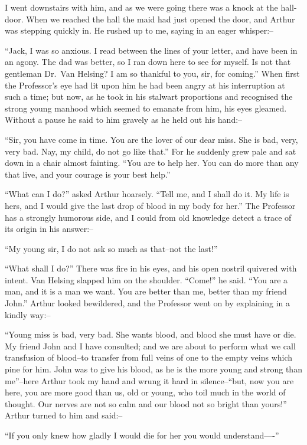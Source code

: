 \documentclass[12pt,openright]{book}
\begin{document}
I went downstairs with him, and as we were going there was a knock at the hall-door. When we reached the hall the maid had just opened the door, and Arthur was stepping quickly in. He rushed up to me, saying in an eager whisper:–

“Jack, I was so anxious. I read between the lines of your letter, and have been in an agony. The dad was better, so I ran down here to see for myself. Is not that gentleman Dr. Van Helsing? I am so thankful to you, sir, for coming.” When first the Professor’s eye had lit upon him he had been angry at his interruption at such a time; but now, as he took in his stalwart proportions and recognised the strong young manhood which seemed to emanate from him, his eyes gleamed. Without a pause he said to him gravely as he held out his hand:–

“Sir, you have come in time. You are the lover of our dear miss. She is bad, very, very bad. Nay, my child, do not go like that.” For he suddenly grew pale and sat down in a chair almost fainting. “You are to help her. You can do more than any that live, and your courage is your best help.”

“What can I do?” asked Arthur hoarsely. “Tell me, and I shall do it. My life is hers, and I would give the last drop of blood in my body for her.” The Professor has a strongly humorous side, and I could from old knowledge detect a trace of its origin in his answer:–

“My young sir, I do not ask so much as that–not the last!”

“What shall I do?” There was fire in his eyes, and his open nostril quivered with intent. Van Helsing slapped him on the shoulder. “Come!” he said. “You are a man, and it is a man we want. You are better than me, better than my friend John.” Arthur looked bewildered, and the Professor went on by explaining in a kindly way:–

“Young miss is bad, very bad. She wants blood, and blood she must have or die. My friend John and I have consulted; and we are about to perform what we call transfusion of blood–to transfer from full veins of one to the empty veins which pine for him. John was to give his blood, as he is the more young and strong than me”–here Arthur took my hand and wrung it hard in silence–“but, now you are here, you are more good than us, old or young, who toil much in the world of thought. Our nerves are not so calm and our blood not so bright than yours!” Arthur turned to him and said:–

“If you only knew how gladly I would die for her you would understand—-”
\end{document}
